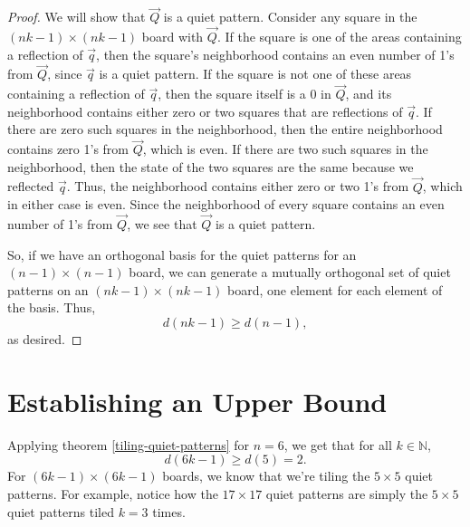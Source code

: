 \documentclass[a4paper]{article}
\newcommand{\N}{\mathbb{N}}
\begin{document}
\begin{proof}
		We will show that $\vec{Q}$ is a quiet pattern.
		Consider any square in the $(nk-1) \times (nk-1)$ board with $\vec{Q}$.
		If the square is one of the areas containing a reflection of $\vec{q}$, then the square's neighborhood contains an even number of 1's from $\vec{Q}$, since $\vec{q}$ is a quiet pattern.
		If the square is not one of these areas containing a reflection of $\vec{q}$, then the square itself is a 0 in $\vec{Q}$, and its neighborhood contains either zero or two squares that are reflections of $\vec{q}$.
		If there are zero such squares in the neighborhood, then the entire neighborhood contains zero 1's from $\vec{Q}$, which is even.
		If there are two such squares in the neighborhood, then the state of the two squares are the same because we reflected $\vec{q}$.
		Thus, the neighborhood contains either zero or two 1's from $\vec{Q}$, which in either case is even.
		Since the neighborhood of every square contains an even number of 1's from $\vec{Q}$, we see that $\vec{Q}$ is a quiet pattern.
		
		So, if we have an orthogonal basis for the quiet patterns for an $(n-1) \times (n-1)$ board, we can generate a mutually orthogonal set of quiet patterns on an $(nk-1) \times (nk-1)$ board, one element for each element of the basis. 
		Thus,
		\begin{equation*}
			d(nk-1) \geq d(n-1),
		\end{equation*}
		as desired.
	\end{proof}

	\section{Establishing an Upper Bound}
	Applying theorem \ref{tiling-quiet-patterns} for $n=6$, we get that for all $k \in \N$,
	\begin{equation*}
		d(6k - 1) \geq d(5) = 2.
	\end{equation*}
	For $(6k-1) \times (6k-1)$ boards, we know that we're tiling the $5 \times5 $ quiet patterns.
	For example, notice how the $17 \times 17$ quiet patterns are simply the $5 \times 5$ quiet patterns tiled $k=3$ times.
	
\end{document}
